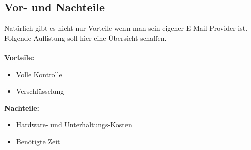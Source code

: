\subsection{Vor- und Nachteile}
Natürlich gibt es nicht nur Vorteile wenn man sein eigener E-Mail Provider ist. Folgende Auflistung soll hier eine Übersicht schaffen. \\ \\

\textbf{Vorteile:}
\begin{itemize}
    \item Volle Kontrolle
    \item Verschlüsselung
\end{itemize}

\textbf{Nachteile:}
\begin{itemize}
    \item Hardware- und Unterhaltungs-Kosten
    \item Benötigte Zeit
\end{itemize}
